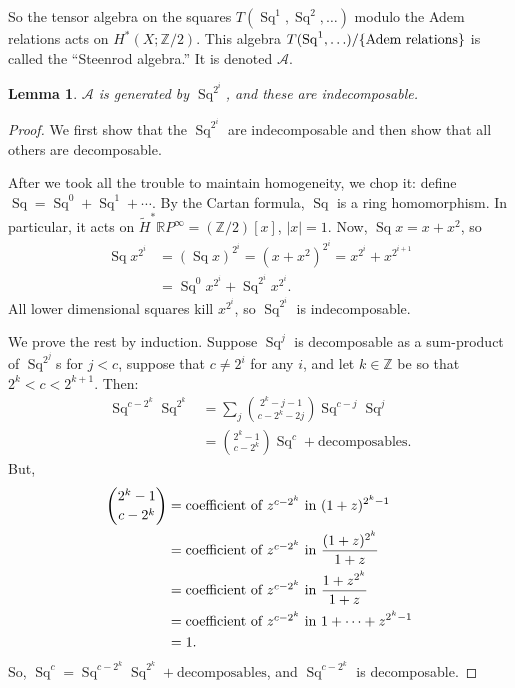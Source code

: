 \documentclass{article}
\newcommand{\Z}{\mathbb{Z}}
\newcommand{\R}{\mathbb{R}}
\newcommand{\RP}{\R P}
\newcommand{\SA}{\mathcal{A}}
\DeclareMathOperator{\Sq}{Sq}
\newtheorem{lem}[thm]{Lemma}
\begin{document}
So the tensor algebra on the squares $T(\Sq^1, \Sq^2, \ldots)$ modulo the Adem relations acts on $H^*(X; \Z/2)$.  This algebra $T(\Sq^1, \ldots) / \{\hbox{Adem relations}\}$ is called the ``Steenrod algebra.''  It is denoted $\SA$.
\begin{lem}
$\SA$ is generated by $\Sq^{2^i}$, and these are indecomposable.
\end{lem}
\begin{proof}
We first show that the $\Sq^{2^i}$ are indecomposable and then show that all others are decomposable.

After we took all the trouble to maintain homogeneity, we chop it: define $\Sq = \Sq^0 + \Sq^1 + \cdots$.  By the Cartan formula, $\Sq$ is a ring homomorphism.  In particular, it acts on $\tilde H^* \RP^\infty = (\Z/2)[x]$, $|x| = 1$.  Now, $\Sq x = x + x^2$, so
\begin{align*}
\Sq x^{2^i} & = (\Sq x)^{2^i} = (x + x^2)^{2^i} = x^{2^i} + x^{2^{i+1}} \\
& = \Sq^0 x^{2^i} + \Sq^{2^i} x^{2^i}.
\end{align*}
All lower dimensional squares kill $x^{2^i}$, so $\Sq^{2^i}$ is indecomposable.

We prove the rest by induction.  Suppose $\Sq^j$ is decomposable as a sum-product of $\Sq^{2^j}$s for $j < c$, suppose that $c \ne 2^i$ for any $i$, and let $k \in \Z$ be so that $2^k < c < 2^{k+1}$.  Then:
\begin{align*}
\Sq^{c-2^k} \Sq^{2^k} & = \sum_j \binom{2^k - j - 1}{c-2^k-2j} \Sq^{c-j}\Sq^j \\
& = \binom{2^k - 1}{c-2^k} \Sq^c + \mathrm{decomposables}.
\end{align*}
But,
\begin{align*}
\binom{2^k-1}{c-2^k} & = \hbox{coefficient of $z^{c-2^k}$ in}\ (1 + z)^{2^k-1} \\
& = \hbox{coefficient of $z^{c-2^k}$ in}\ \frac{(1+z)^{2^k}}{1+z} \\
& = \hbox{coefficient of $z^{c-2^k}$ in}\ \frac{1 + z^{2^k}}{1+z} \\
& = \hbox{coefficient of $z^{c-2^k}$ in}\ 1 + \cdots + z^{2^k - 1} \\
& = 1.
\end{align*}
So, $\Sq^c = \Sq^{c-2^k} \Sq^{2^k} + \mathrm{decomposables}$, and $\Sq^{c - 2^k}$ is decomposable.
\end{proof}
\end{document}
